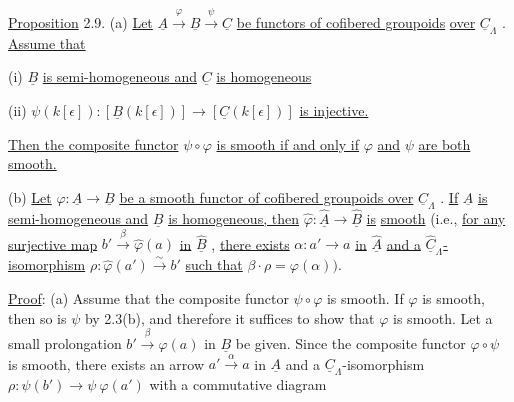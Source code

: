\underline{Proposition} 2.9.  (a)  \underline{Let}  $\underline{A} \xrightarrow{\ \varphi\ } \underline{B} \xrightarrow{\ \psi\ } \underline{C}$  \underline{be functors of cofibered groupoids} \underline{over}  $\underline{C}_{\Lambda}$  . \underline{Assume that}

(i)  $\underline{B}$  \underline{is semi-homogeneous and}  $\underline{C}$  \underline{is homogeneous}

(ii)  $\psi(k[\epsilon]) : [\underline{B}(k[\epsilon])] \longrightarrow [\underline{C}(k[\epsilon])]$  \underline{is injective.}

\underline{Then the composite functor}  $\psi \circ \varphi$  \underline{is smooth if and only if}  $\varphi$  \underline{and}  $\psi$  \underline{are both}
\underline{smooth.}

(b)  \underline{Let} $\varphi : \underline{A} \longrightarrow \underline{B}$ \underline{be a smooth functor of cofibered groupoids over} $\underline{C}_{\Lambda}$ . \underline{If} $\underline{A}$ \underline{is semi-homogeneous and} $\underline{B}$ \underline{is homogeneous, then} $\widehat{\varphi} : \widehat{\underline{A}} \to \widehat{\underline{B}}$ \underline{is} \underline{smooth} (i.e., \underline{for any surjective map} $b' \xrightarrow{\ \beta\ } \widehat{\varphi}(a)$ \underline{in} $\widehat{\underline{B}}$ , \underline{there exists} $\alpha : a' \to a$ \underline{in} $\widehat{\underline{A}}$ \underline{and a} $\widehat{\underline{C}}_{\Lambda}$\underline{-isomorphism} $\rho : \widehat{\varphi}(a') \xrightarrow{\ \sim\ } b'$ \underline{such that} $\beta \cdot \rho = \varphi(\alpha))$.

\underline{Proof}: (a)  Assume that the composite functor $\psi \circ \varphi$ is smooth. If $\varphi$ is smooth, then so is $\psi$ by 2.3(b), and therefore it suffices to show that $\varphi$ is smooth. Let a small prolongation $b' \xrightarrow{\ \beta\ } \varphi(a)$ in $\underline{B}$ be given. Since the composite functor $\varphi \circ \psi$ is smooth, there exists an arrow $a' \xrightarrow{\ \alpha\ } a$ in $\underline{A}$ and a $\underline{C}_{\Lambda}$-isomorphism $\rho : \psi(b') \longrightarrow \psi\ \varphi(a')$ with a commutative diagram

